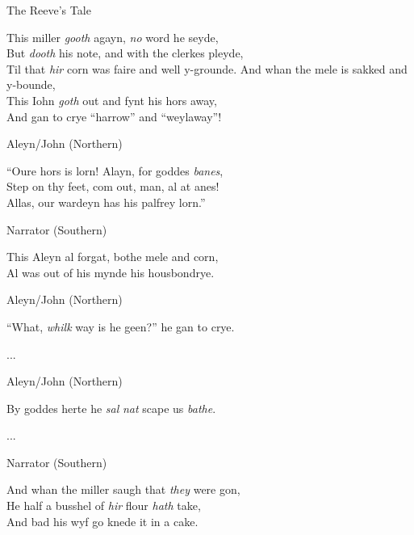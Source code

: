 \begin{texts}{The Reeve's Tale}
\begin{textglossed}
This miller \emph{gooth} agayn, \emph{no} word he seyde,\\
But \emph{dooth} his note, and with the clerkes pleyde,\\ 
Til that \emph{hir} corn was faire and well y-grounde.
And whan the mele is sakked and y-bounde,\\
This Iohn \emph{goth} out and fynt his hors away,\\
And gan to crye ``harrow'' and ``weylaway''! 

Aleyn/John (Northern)

``Oure hors is lorn! Alayn, for goddes \emph{banes}, \\
Step on thy feet, com out, man, al at anes!\\
Allas, our wardeyn has his palfrey lorn.''

Narrator (Southern)

This Aleyn al forgat, bothe mele and corn,\\
Al was out of his mynde his housbondrye.

Aleyn/John (Northern)

``What, \emph{whilk} way is he geen?'' he gan to crye.

...

Aleyn/John (Northern)

By goddes herte he \emph{sal} \emph{nat} scape us \emph{bathe}.

...

Narrator (Southern)

And whan the miller saugh that \emph{they} were gon,\\ 
He half a busshel of \emph{hir} flour \emph{hath} take,\\
And bad his wyf go knede it in a cake.


\end{textglossed}
\end{texts}
